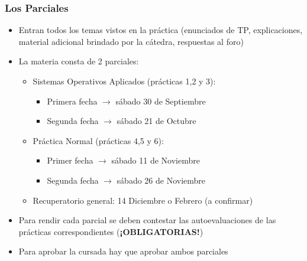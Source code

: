 \begin{frame}
	\frametitle{Los Parciales}
	\begin{itemize}
		\item Entran todos los temas vistos en la práctica (enunciados de TP, explicaciones, material adicional brindado por la cátedra, respuestas al foro)
		\item La materia consta de 2 parciales:
		\begin{itemize}
			\item Sistemas Operativos Aplicados (prácticas 1,2 y 3):
			\begin{itemize}
				\item Primera fecha $\rightarrow$ sábado 30 de Septiembre
				\item Segunda fecha $\rightarrow$ sábado 21 de Octubre
			\end{itemize}
			\item Práctica Normal (prácticas 4,5 y 6):
			\begin{itemize}
				\item Primer fecha $\rightarrow$ sábado 11 de Noviembre
				\item Segunda fecha $\rightarrow$ sábado 26 de Noviembre
			\end{itemize}
			\item Recuperatorio general: 14 Diciembre o Febrero (a confirmar)
		\end{itemize}
		\item Para rendir cada parcial se deben contestar las autoevaluaciones de las prácticas correspondientes (\textbf{¡OBLIGATORIAS!})
		\item Para aprobar la cursada hay que aprobar ambos parciales
	\end{itemize}
\end{frame}
